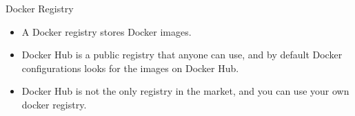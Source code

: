 \begin{frame}{Docker Registry}
    \begin{itemize}[<+- | alert@+>]
        \item A Docker registry stores Docker images.
        \item Docker Hub is a public registry that anyone can use, and by default Docker configurations looks for the images on Docker Hub.
        \item Docker Hub is not the only registry in the market, and you can use your own docker registry.
    \end{itemize}
\end{frame}
